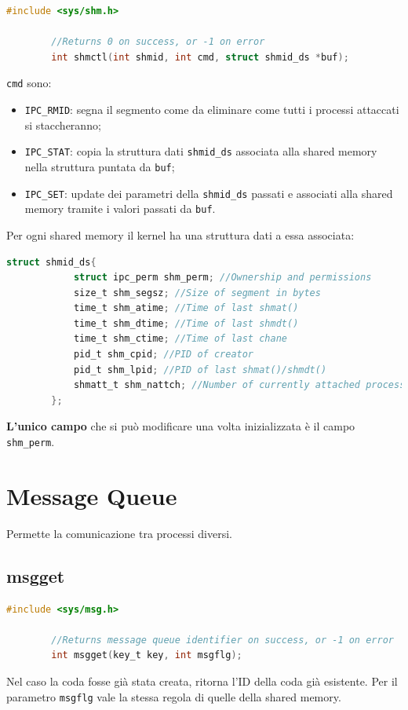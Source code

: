 \documentclass[a4paper, 12pt]{book}
\begin{document}
    \begin{lstlisting}[language=C]
        #include <sys/shm.h>

        //Returns 0 on success, or -1 on error 
        int shmctl(int shmid, int cmd, struct shmid_ds *buf);
    \end{lstlisting}
    \verb|cmd| sono:
    \begin{itemize}
        \item \verb|IPC_RMID|: segna il segmento come da eliminare 
        come tutti i processi attaccati si staccheranno;
        \item \verb|IPC_STAT|: copia la struttura dati \verb|shmid_ds| 
        associata alla shared memory nella struttura puntata da \verb|buf|;
        \item \verb|IPC_SET|: update dei parametri della \verb|shmid_ds| 
        passati e associati alla shared memory tramite i valori 
        passati da \verb|buf|.
    \end{itemize}
    Per ogni shared memory il kernel ha una struttura dati 
    a essa associata:
    \begin{lstlisting}[language=C]
        struct shmid_ds{
            struct ipc_perm shm_perm; //Ownership and permissions 
            size_t shm_segsz; //Size of segment in bytes 
            time_t shm_atime; //Time of last shmat()
            time_t shm_dtime; //Time of last shmdt()
            time_t shm_ctime; //Time of last chane 
            pid_t shm_cpid; //PID of creator 
            pid_t shm_lpid; //PID of last shmat()/shmdt()
            shmatt_t shm_nattch; //Number of currently attached processes
        };
    \end{lstlisting}
    \textbf{L'unico campo} che si può modificare una 
    volta inizializzata è il campo \verb|shm_perm|.

    \section{Message Queue}

    Permette la comunicazione tra processi diversi.

    \subsection{msgget}

    \begin{lstlisting}[language=C]
        #include <sys/msg.h>

        //Returns message queue identifier on success, or -1 on error 
        int msgget(key_t key, int msgflg);
    \end{lstlisting}
    Nel caso la coda fosse già stata creata, ritorna l'ID 
    della coda già esistente. Per il parametro \verb|msgflg|
    vale la stessa regola di quelle della shared memory.
\end{document}
